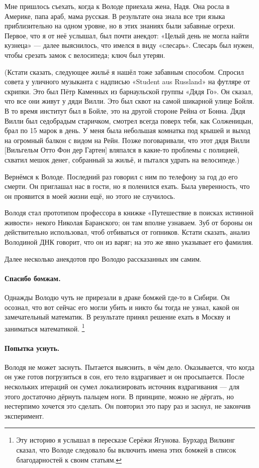\documentclass{book}
\begin{document}
Мне пришлось съехать, когда к Володе приехала жена, Надя.
Она росла в Америке, папа араб, мама русская.
В результате она знала все три языка приблизительно на одном уровне, но в этих знаниях были забавные огрехи.
Первое, что я от неё услышал, был почти анекдот: «Целый день не могла найти кузнеца» --- далее выяснилось, что имелся в виду «слесарь».
Слесарь был нужен, чтобы срезать замок с велосипеда; ключ был утерян.

(Кстати сказать, следующее жильё я нашёл тоже забавным способом.
Спросил совета у уличного музыканта с надписью «Student aus Russland» на футляре от скрипки.
Это был Пётр Каменных из барнаульской группы «Дядя Го».
Он сказал, что все они живут у дяди Вилли.
Это был сквот на самой шикарной улице Бойля.
В то время институт был в Бойле, это на другой стороне Рейна от Бонна.
Дядя Вилли был седобрадым старичком, смотрел всегда поверх тебя, как Солженицын, брал по 15 марок в день.
У меня была небольшая комнатка под крышей и выход на огромный балкон с видом на Рейн.
Позже поговаривали, что этот дядя Вилли [Вильгельм Отто Фон дер Гартен] вляпался в какие-то проблемы с полицией, схватил мешок денег, собранный за жильё, и пытался удрать на велосипеде.)

Вернёмся к Володе.
Последний раз говорил с ним по телефону за год до его смерти.
Он приглашал нас в гости, но я поленился ехать.
Была уверенность, что он проявится в моей жизни ещё, но этого не случилось.

Володя стал прототипом профессора в книжке «Путешествие в поисках истинной живости» некого Николая Баранского; он там вполне узнаваем.
Зуб от бороны он действительно использовал, чтоб отбиваться от гопников.
Кстати сказать, анализ Володиной ДНК говорит, что он из варяг;
на это же явно указывает его фамилия.

Далее несколько анекдотов про Володю рассказанных им самим.

\paragraph{Спасибо бомжам.}
Однажды Володю чуть не прирезали в драке бомжей где-то в Сибири.
Он осознал, что вот сейчас его могли убить и никто бы тогда не узнал, какой он замечательный математик.
В результате принял решение ехать в Москву и заниматься математикой.%
\footnote{Эту историю я услышал в пересказе Серёжи Ягунова.
Бурхард Вилкинг сказал, что Володе следовало бы включить имена этих бомжей в список благодарностей к своим статьям.}


\paragraph{Попытка уснуть.}
Володя не может заснуть.
Пытается выяснить, в чём дело.
Оказывается, что когда он уже готов погрузиться в сон, его тело вздрагивает и он просыпается.
После нескольких итераций он сумел локализировать источник вздрагивания --- для этого достаточно дёрнуть пальцем ноги.
В принципе, можно не дёргать, но нестерпимо хочется это сделать.
Он повторил это пару раз и заснул, не закончив эксперимент.
\end{document}
